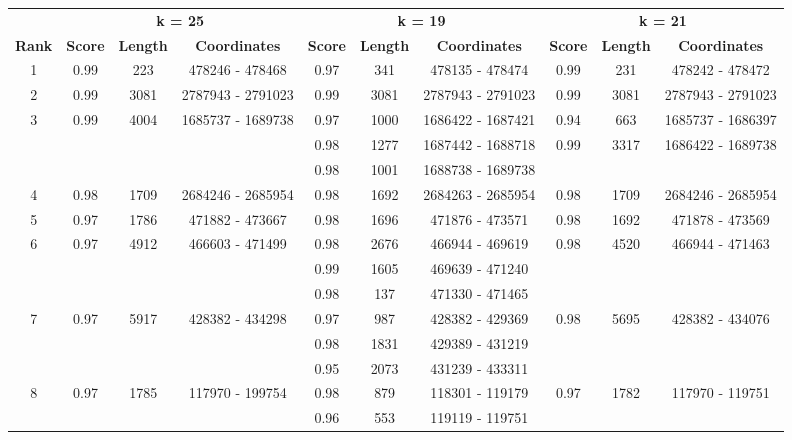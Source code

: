 \documentclass[a4paper,10pt]{article}
\begin{document}
\begin{landscape}
\mbox{}\vfill
\begin{table}[!h]
\renewcommand{\arraystretch}{1.2}
\centering
\begin{tabular}{| c | c c c | c c c | c c c |}
  \cline{1-10}
  & \multicolumn{3}{c|}{\textbf{k = 25}} & \multicolumn{3}{c|}{\textbf{k = 19}} & \multicolumn{3}{c|}{\textbf{k = 21}} \\
  \cline{2-4} \cline{5-7} \cline{8-10}
  \textbf{Rank} & \textbf{Score} & \textbf{Length} & \textbf{Coordinates} & \textbf{Score} & \textbf{Length} & \textbf{Coordinates} & \textbf{Score} & \textbf{Length} & \textbf{Coordinates} \\ \cline{1-10}
  1 & 0.99 & 223 & 478246 - 478468 & 0.97 & 341 & 478135 - 478474 & 0.99 & 231 & 478242 - 478472 \\ \cline{1-10}
  2 & 0.99 & 3081 & 2787943 - 2791023 & 0.99 & 3081 & 2787943 - 2791023 & 0.99 & 3081 & 2787943 - 2791023 \\ \cline{1-10}
  3 & 0.99 & 4004 & 1685737 - 1689738 & 0.97 & 1000 & 1686422 - 1687421 & 0.94 & 663 & 1685737 - 1686397 \\
  & & & & 0.98 & 1277 & 1687442 - 1688718 & 0.99 & 3317 & 1686422 - 1689738 \\
  & & & & 0.98 & 1001 & 1688738 - 1689738 & & & \\ \cline{1-10}
  4 & 0.98 & 1709 & 2684246 - 2685954 & 0.98 & 1692 & 2684263 - 2685954 & 0.98 & 1709 & 2684246 - 2685954 \\ \cline{1-10}
  5 & 0.97 & 1786 & 471882 - 473667 & 0.98 & 1696 & 471876 - 473571 & 0.98 & 1692 & 471878 - 473569 \\ \cline{1-10}
  6 & 0.97 & 4912 & 466603 - 471499 & 0.98 & 2676 & 466944 - 469619 & 0.98 & 4520 & 466944 - 471463 \\
  & & & & 0.99 & 1605 & 469639 - 471240 & & & \\
  & & & & 0.98 & 137 & 471330 - 471465 & & & \\ \cline{1-10}
  7 & 0.97 & 5917 & 428382 - 434298 & 0.97 & 987 & 428382 - 429369 & 0.98 & 5695 & 428382 - 434076 \\
  & & & & 0.98 & 1831 & 429389 - 431219 & & & \\
  & & & & 0.95 & 2073 & 431239 - 433311 & & & \\ \cline{1-10}
  8 & 0.97 & 1785 & 117970 - 199754 & 0.98 & 879 & 118301 - 119179 & 0.97 & 1782 & 117970 - 119751 \\
  & & & & 0.96 & 553 & 119119 - 119751 & & & \\ \cline{1-10}

\end{tabular}
\end{table}
\end{landscape}
\end{document}
